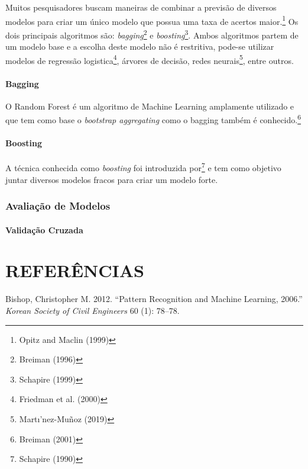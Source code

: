 \documentclass[
	12pt,				%
	a4paper,		%
	oneside,    %
	chapter=TITLE,		   %
	section=TITLE,		   %
	subsection=TITLE,	   %
	subsubsection=TITLE, %
	english,			%
	french,				%
	spanish,			%
	brazil,				%
]{abntex2}
\begin{document}
Muitos pesquisadores buscam maneiras de combinar a previsão de diversos
modelos para criar um único modelo que possua uma taxa de acertos
maior.\footnote{Opitz and Maclin (1999)} Os dois principais algoritmos
são: \emph{bagging}\footnote{Breiman (1996)} e \emph{boosting}\footnote{Schapire
  (1999)}. Ambos algoritmos partem de um modelo base e a escolha deste
modelo não é restritiva, pode-se utilizar modelos de regressão
logistica\footnote{Friedman et al. (2000)}, árvores de decisão, redes
neurais\footnote{Martı'nez-Muñoz (2019)}, entre outros.

\hypertarget{bagging}{%
\subsubsection{Bagging}\label{bagging}}

O Random Forest é um algoritmo de Machine Learning amplamente utilizado
e que tem como base o \emph{bootstrap aggregating} como o bagging também
é conhecido.\footnote{Breiman (2001)}

\hypertarget{boosting}{%
\subsubsection{Boosting}\label{boosting}}

A técnica conhecida como \emph{boosting} foi introduzida por\footnote{Schapire
  (1990)} e tem como objetivo juntar diversos modelos fracos para criar
um modelo forte.

\hypertarget{avaliauxe7uxe3o-de-modelos}{%
\subsection{Avaliação de Modelos}\label{avaliauxe7uxe3o-de-modelos}}

\hypertarget{validauxe7uxe3o-cruzada}{%
\subsubsection{Validação Cruzada}\label{validauxe7uxe3o-cruzada}}

\newpage

\hypertarget{referuxeancias}{%
\chapter*{REFERÊNCIAS}\label{referuxeancias}}

\hypertarget{refs}{}
\leavevmode\hypertarget{ref-bishop2012pattern}{}%
Bishop, Christopher M. 2012. ``Pattern Recognition and Machine Learning,
2006.'' \emph{Korean Society of Civil Engineers} 60 (1): 78--78.
\end{document}
